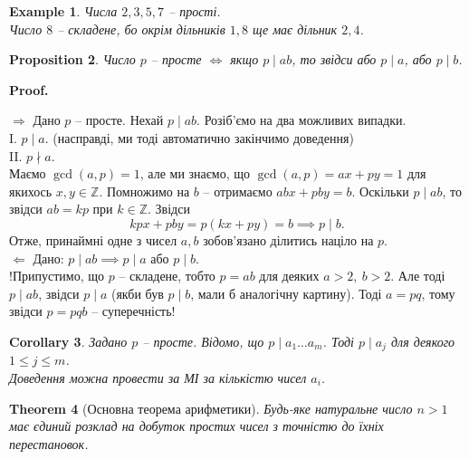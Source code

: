 \documentclass[a4paper, 10pt]{article}
\makeatletter
\theoremstyle{theoremdd}
\newtheorem{theorem}{Theorem}[subsection]
\theoremstyle{theoremdd}
\theoremstyle{theoremdd}
\theoremstyle{theoremdd}
\newtheorem{example}[theorem]{Example}
\theoremstyle{theoremdd}
\newtheorem{proposition}[theorem]{Proposition}
\theoremstyle{theoremdd}
\theoremstyle{theoremdd}
\theoremstyle{theoremdd}
\newtheorem{corollary}[theorem]{Corollary}
\def\rightproof{$\boxed{\Rightarrow}$ }
\def\leftproof{$\boxed{\Leftarrow}$ }
\renewenvironment{proof}[1][Proof.\\]{\par
\pushQED{\hfill \qed}%
\normalfont \topsep6\p@\@plus6\p@\relax
\trivlist
\item\relax
{\bfseries
#1\@addpunct{.}}\hspace\labelsep\ignorespaces
}{%
\popQED\endtrivlist\@endpefalse
}
\makeatother
\begin{document}
\begin{example}
Числа $2,3,5,7$ -- прості.\\
Число $8$ -- складене, бо окрім дільників $1,8$ ще має дільник $2,4$.
\end{example}

\begin{proposition}
Число $p$ -- просте $\iff$ якщо $p \mid ab$, то звідси або $p \mid a$, або $p \mid b$.
\end{proposition}

\begin{proof}
\rightproof Дано $p$ -- просте. Нехай $p \mid ab$. Розіб'ємо на два можливих випадки.\\
I. $p \mid a$. (насправді, ми тоді автоматично закінчимо доведення)
\bigskip \\
II. $p \nmid a$.\\
Маємо $\gcd(a,p) = 1$, але ми знаємо, що $\gcd (a,p) = ax+py = 1$ для якихось $x,y \in \mathbb{Z}$. Помножимо на $b$ -- отримаємо $abx + pby = b$. Оскільки $p \mid ab$, то звідси $ab = kp$ при $k \in \mathbb{Z}$. Звідси \[
kpx + pby = p(kx+py) = b \implies p \mid b.
\]
Отже, принаймні одне з чисел $a,b$ зобов'язано ділитись націло на $p$.
\bigskip \\
\leftproof Дано: $p \mid ab \implies p \mid a$ або $p \mid b$.\\
!Припустимо, що $p$ -- складене, тобто $p = ab$ для деяких $a > 2,\ b > 2$. Але тоді $p \mid ab$, звідси $p \mid a$ (якби був $p \mid b$, мали б аналогічну картину). Тоді $a = pq$, тому звідси $p = pqb$ -- суперечність!
\end{proof}

\begin{corollary}
Задано $p$ -- просте. Відомо, що $p \mid a_1 \dots a_m$. Тоді $p \mid a_j$ для деякого $1 \leq j \leq m$.\\
\textit{Доведення можна провести за МІ за кількістю чисел $a_i$.}
\end{corollary}

\begin{theorem}[Основна теорема арифметики]
Будь-яке натуральне число $n > 1$ має єдиний розклад на добуток простих чисел з точністю до їхніх перестановок.
\end{theorem}
\end{document}
